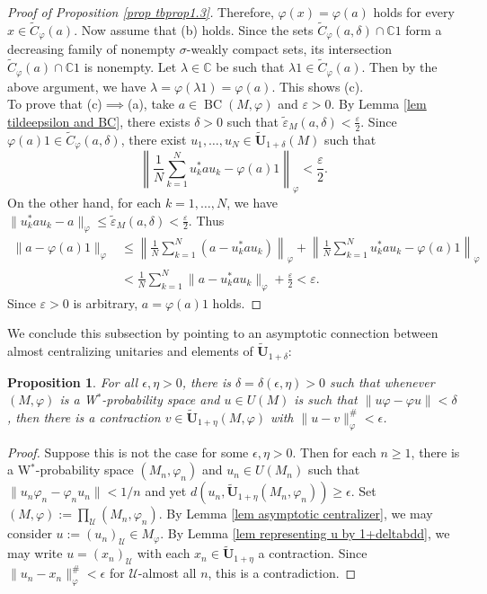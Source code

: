\documentclass[12pt]{amsart}
\newtheorem{prop}[thm]{Proposition}
\theoremstyle{definition}
\newcommand{\ep}{\varepsilon}
\def\u{\mathsf 1}
\def \u{\mathcal U}
\def\BC{\operatorname{BC}}
\begin{document}
\begin{proof}[Proof of Proposition \ref{prop tbprop1.3}]
Therefore, $\varphi(x)=\varphi(a)$ holds for every $x\in \widetilde{C}_{\varphi}(a)$. 
Now assume that (b) holds. Since the sets $\widetilde{C}_{\varphi}(a,\delta)\cap \mathbb{C}1$ form a decreasing family of nonempty $\sigma$-weakly compact sets, its intersection $\widetilde{C}_{\varphi}(a)\cap \mathbb{C}1$ is nonempty. Let $\lambda\in \mathbb{C}$ be such that $\lambda 1\in \widetilde{C}_{\varphi}(a)$. Then by the above argument, we have $\lambda=\varphi(\lambda 1)=\varphi(a)$. This shows (c).\\
To prove that (c)$\implies$(a), take $a\in \BC(M,\varphi)$ and $\ep>0$. By Lemma \ref{lem tildeepsilon and BC}, there exists $\delta>0$ such that $\tilde{\ep}_{M}(a,\delta)<\frac{\ep}{2}$. Since $\varphi(a)1\in \widetilde{C}_{\varphi}(a,\delta)$, there exist $u_1,\dots,u_N\in \tilde{\mathbf{U}}_{1+\delta}(M)$ such that 
$$\left \|\frac{1}{N}\sum_{k=1}^Nu_k^*au_k-\varphi (a)1\right \|_{\varphi}<\frac{\ep}{2}.$$
On the other hand, for each $k=1,\dots,N$, we have 
$\|u_k^*au_k-a\|_{\varphi}\le \tilde{\ep}_M(a,\delta)<\frac{\ep}{2}$. Thus 
\begin{align*}
    \|a-\varphi(a)1\|_{\varphi}&\le \left \|\frac{1}{N}\sum_{k=1}^N(a-u_k^*au_k)\right \|_{\varphi}+\left \|\frac{1}{N}\sum_{k=1}^Nu_k^*au_k-\varphi(a)1\right \|_{\varphi}\\
    &< \frac{1}{N}\sum_{k=1}^N\|a-u_k^*au_k\|_{\varphi}+\frac{\ep}{2}<\ep.
\end{align*}
Since $\ep>0$ is arbitrary, $a=\varphi(a)1$ holds. 
\end{proof}

We conclude this subsection by pointing to an asymptotic connection between almost centralizing unitaries and elements of $\tilde{\mathbf{U}}_{1+\delta}$:

\begin{prop}\label{almostcentralizingalmostunitary}
    For all $\epsilon,\eta>0$, there is $\delta=\delta(\epsilon,\eta)>0$ such that whenever $(M,\varphi)$ is a W$^*$-probability space and $u\in U(M)$ is such that $\|u\varphi-\varphi u\|<\delta$, then there is a contraction $v\in \tilde{\mathbf{U}}_{1+\eta}(M,\varphi)$ with $\|u-v\|_\varphi^\#<\epsilon$. 
\end{prop}

\begin{proof}
Suppose this is not the case for some $\epsilon,\eta>0$.  
Then for each $n\geq 1$, there is a W$^*$-probability space $(M_n,\varphi_n)$ and $u_n\in U(M_n)$ such that $\|u_n\varphi_n-\varphi_n u_n\|<1/n$ and yet $d(u_n,\tilde{\mathbf{U}}_{1+\eta}(M_n,\varphi_n))\geq \epsilon$.  Set $(M,\varphi):=\prod_\u (M_n,\varphi_n)$.  By Lemma \ref{lem asymptotic centralizer}, we may consider $u:=(u_n)_\u\in M_\varphi$.  By Lemma \ref{lem representing u by 1+deltabdd}, we may write $u=(x_n)_\u$ with each $x_n\in \tilde{\mathbf{U}}_{1+\eta}$ a contraction.  Since $\|u_n-x_n\|_\varphi^\#<\epsilon$ for $\u$-almost all $n$, this is a contradiction.
\end{proof}
\end{document}
